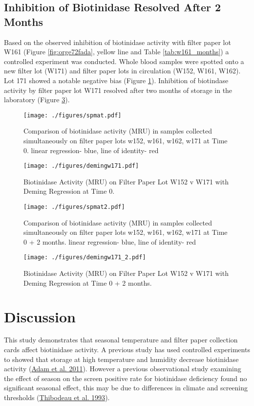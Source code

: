 \documentclass[review]{elsarticle}
\begin{document}
\subsection*{Inhibition of Biotinidase Resolved After 2 Months}
\label{sec:org19d073e}
Based on the observed inhibition of biotinidase activity with filter
paper lot W161 (Figure \ref{fig:orge72fada}, yellow line and Table
\ref{tab:w161_months}) a controlled experiment was conducted. Whole
blood samples were spotted onto a new filter lot (W171) and filter
paper lots in circulation (W152, W161, W162). Lot 171 showed a notable
negative bias (Figure \ref{fig:orgbfa15a0}). Inhibition of biotindase activity by
filter paper lot W171 resolved after two months of storage in the
laboratory (Figure \ref{fig:org74310da}).

\begin{figure}[htbp]
\centering
\texttt{[image: ./figures/spmat.pdf]}
\caption{\label{fig:orgbfa15a0}Comparison of biotinidase activity (MRU) in samples collected simultaneously on filter paper lots w152, w161, w162, w171 at Time 0. linear regression- blue, line of identity- red}
\end{figure}

\begin{figure}[htbp]
\centering
\texttt{[image: ./figures/demingw171.pdf]}
\caption{\label{fig:org8be5721}Biotinidase Activity (MRU) on Filter Paper Lot W152 v W171 with Deming Regression at Time 0.}
\end{figure}
\clearpage

\begin{figure}[htbp]
\centering
\texttt{[image: ./figures/spmat2.pdf]}
\caption{\label{fig:org74310da}Comparison of biotinidase activity (MRU) in samples collected simultaneously on filter paper lots w152, w161, w162, w171 at Time 0 + 2 months. linear regression- blue, line of identity- red}
\end{figure}

\begin{figure}[htbp]
\centering
\texttt{[image: ./figures/demingw171\_2.pdf]}
\caption{\label{fig:org94dd72a}Biotinidase Activity (MRU) on Filter Paper Lot W152 v W171 with Deming Regression at Time 0 + 2 months.}
\end{figure}

\clearpage


\section*{Discussion}
\label{sec:org79e3d05}
This study demonstrates that seasonal temperature and filter paper
collection cards affect biotinidase activity. A previous study has
used controlled experiments to showed that storage at high temperature
and humidity decrease biotinidase activity (\hyperlink{citeproc_bib_item_1}{Adam et al. 2011}). However a
previous observational study examining the effect of season on the
screen positive rate for biotinidase deficiency found no significant
seasonal effect, this may be due to differences in climate and
screening thresholds (\hyperlink{citeproc_bib_item_12}{Thibodeau et al. 1993}).
\end{document}
